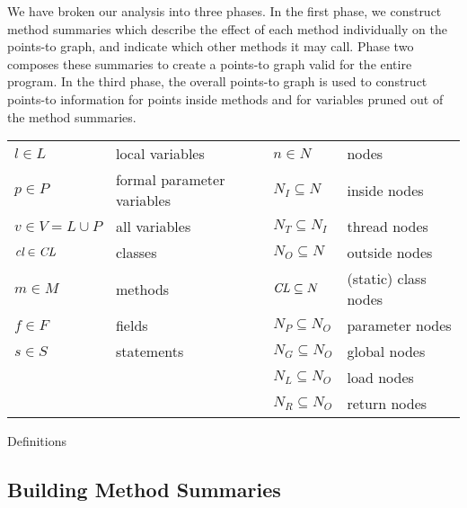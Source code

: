 \documentclass[11pt,notitlepage]{article}
\newcommand{\bigvar}[1]{\ensuremath{\text{\it #1}}}
\begin{document}
We have broken our analysis into three phases.  In the first phase, we
construct method summaries which describe the effect of each method
individually on the points-to graph, and indicate which other methods
it may call.  Phase two composes these summaries to create a points-to
graph valid for the entire program.  In the third phase, the overall
points-to graph is used to construct points-to information for
points inside methods and for variables pruned out of the method
summaries.

\begin{myfigure}
\begin{tabular}{ll|ll}
$l\in L$ & local variables           &$n\in N$ & nodes\\
$p\in P$ & formal parameter variables&$N_I\subseteq N$ & inside nodes\\
$v\in V=L\cup P$& all variables      &$N_T\subseteq N_I$ & thread nodes\\
$\bigvar{cl}\in \bigvar{CL}$& classes&$N_O\subseteq N$ & outside nodes\\
$m\in M$ & methods                   &$\bigvar{CL}\subseteq N$ 
                                                       & (static) class nodes\\
$f\in F$ & fields                    &$N_P\subseteq N_O$ & parameter nodes\\
$s\in S$ & statements                &$N_G\subseteq N_O$ & global nodes\\
         &                           &$N_L\subseteq N_O$ & load nodes\\
         &                           &$N_R\subseteq N_O$ & return nodes\\
\end{tabular}
\caption{Definitions}
\label{fig:defin}
\end{myfigure}

\subsection{Building Method Summaries}
                             
\end{document}
